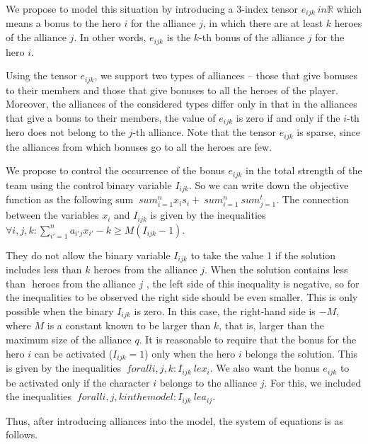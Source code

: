 \documentclass{article}
\begin{document}
We propose to model this situation by introducing a 3-index tensor $ e_ {ijk} \ in \mathbb {R} $ which means a bonus to the hero $i$ for the alliance $ j $, in which there are at least $k$ heroes of the alliance $ j $. In other words, $ e_{ijk} $ is the $k$-th bonus of the alliance $ j$ for the hero $i$.

Using the tensor $ e_ {ijk} $, we support two types of alliances -- those that give bonuses to their members and those that give bonuses to all the heroes of the player. Moreover, the alliances of the considered types differ only in that in the alliances that give a bonus to their members, the value of $ e_{ijk} $ is zero if and only if the $i$-th hero does not belong to the $j$-th alliance. Note that the tensor $ e_{ijk} $ is sparse, since the alliances from which bonuses go to all the heroes are few.

We propose to control the occurrence of the bonus $ e_ {ijk} $ in the total strength of the team using the control binary variable $ I_ {ijk} $.
So we can write down the objective function as the following sum $ \ sum_ {i = 1} ^ {n} x_i s_i + \ sum_ {i = 1} ^ {n} \ sum_ {j = 1} ^ {t} $.
The connection between the variables $ x_ {i} $ and $ I_ {ijk} $ is given by the inequalities
$\forall{i,j,k} :  \sum_{i'=1}^{n} a_{i'j} x_{i'} - k \ge M( I_{ijk}  - 1)$. 

They do not allow the binary variable $ I_{ijk} $ to take the value 1 if the solution includes less than $ k $ heroes from the alliance $j$. When the solution contains less than $ $ heroes from the alliance $j$ , the left side of this inequality is negative, so for the inequalities to be observed the right side should be even smaller. This is only possible when the binary $ I_{ijk} $ is zero. In this case, the right-hand side is $-M $, where $M$ is a constant known to be larger than $ k $, that is, larger than the maximum size of the alliance $q$.
It is reasonable to require that the bonus for the hero $i$ can be activated ($ I_ {ijk} = 1 $) only when the hero $i$ belongs the solution. This is given by the inequalities $ \ forall {i, j, k}: I_ {ijk} \ le x_i $. We also want the bonus $ e_ {ijk} $ to be activated only if the character $ i $ belongs to the alliance $ j $. For this, we included the inequalities $ \ forall {i, j, k} in the model: I_ {ijk} \ le a_ {ij} $.

Thus, after introducing alliances into the model, the system of equations is as follows.
\end{document}
